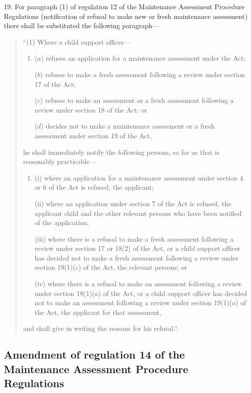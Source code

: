 \documentclass[12pt,a4paper]{article}
\begin{document}
19.  For paragraph (1) of regulation 12 of the Maintenance Assessment Procedure Regulations (notification of refusal to make new or fresh maintenance assessment) there shall be substituted the following paragraph—
\begin{quotation}
“(1) Where a child support officer—
\begin{enumerate}\item[]
($a$) refuses an application for a maintenance assessment under the Act;

($b$) refuses to make a fresh assessment following a review under section 17 of the Act;

($c$) refuses to make an assessment or a fresh assessment following a review under section 18 of the Act; or

($d$) decides not to make a maintenance assessment or a fresh assessment under section 19 of the Act,
\end{enumerate}
he shall immediately notify the following persons, so far as that is reasonably practicable—
\begin{enumerate}\item[]
(i) where an application for a maintenance assessment under section 4 or 6 of the Act is refused, the applicant;

(ii) where an application under section 7 of the Act is refused, the applicant child and the other relevant persons who have been notified of the application;

(iii) where there is a refusal to make a fresh assessment following a review under section 17 or 18(2) of the Act, or a child support officer has decided not to make a fresh assessment following a review under section 19(1)($c$) of the Act, the relevant persons; or

(iv) where there is a refusal to make an assessment following a review under section 18(1)($a$) of the Act, or a child support officer has decided not to make an assessment following a review under section 19(1)($a$) of the Act, the applicant for that assessment,
\end{enumerate}
and shall give in writing the reasons for his refusal.”.
\end{quotation}

\subsection[20. Amendment of regulation 14 of the Maintenance Assessment Procedure Regulations]{Amendment of regulation 14 of the Maintenance Assessment Procedure Regulations}
\end{document}
